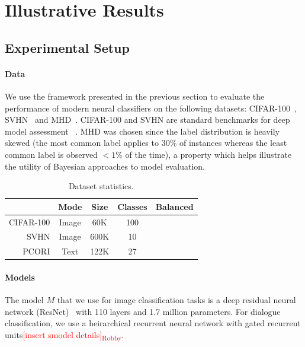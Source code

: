 \documentclass{article}
\newcommand{\cmark}{\ding{51}}%
\newcommand{\xmark}{\ding{55}}%
\newcommand{\robby}[1]{\textcolor{Red}{[#1]\textsubscript{Robby}}}
\begin{document}
\section{Illustrative Results}


\subsection{Experimental Setup}

\paragraph{Data}
We use the framework presented in the previous section to evaluate the performance of modern neural classifiers on the following datasets:
    CIFAR-100~\cite{krizhevsky2009learning},
    SVHN~\cite{netzer2011reading} and
    MHD~\cite{tai_seale2016mhd}.
CIFAR-100 and SVHN are standard benchmarks for deep model assessment ~\cite{guo2017calibration, hendrycks2019benchmarking}.
MHD was chosen since the label distribution is heavily skewed (the most common label applies to $30\%$ of instances whereas the least common label is observed $<1\%$ of the time), a property which helps illustrate the utility of Bayesian approaches to model evaluation.

\begin{table}[t]
    \centering
    \begin{tabular}{rcccc}
        \toprule
                        & Mode  & Size  & Classes   & Balanced  \\
        \midrule
             CIFAR-100  & Image & 60K   & 100       & \cmark    \\
             SVHN       & Image & 600K  & 10        & \cmark    \\
             PCORI      & Text  & 122K  & 27        & \xmark    \\
        \bottomrule
    \end{tabular}
    \caption{Dataset statistics.}
    \label{tab:datasets}
\end{table}

\paragraph{Models}
The model $M$ that we use for image classification tasks is a deep residual neural network (ResNet)~\cite{he2016deep} with 110 layers and 1.7 million parameters.
For dialogue classification, we use a heirarchical recurrent neural network with gated recurrent units\robby{insert smodel details}.
\end{document}
